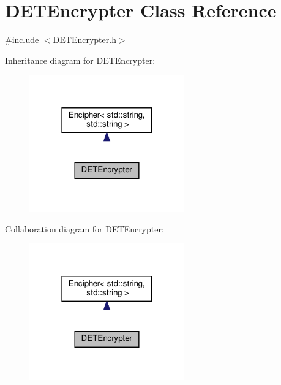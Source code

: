 \hypertarget{classDETEncrypter}{}\section{D\+E\+T\+Encrypter Class Reference}
\label{classDETEncrypter}


{\ttfamily \#include $<$D\+E\+T\+Encrypter.\+h$>$}



Inheritance diagram for D\+E\+T\+Encrypter\+:
\nopagebreak
\begin{figure}[H]
\begin{center}
\leavevmode
\includegraphics[width=190pt]{classDETEncrypter__inherit__graph}
\end{center}
\end{figure}


Collaboration diagram for D\+E\+T\+Encrypter\+:
\nopagebreak
\begin{figure}[H]
\begin{center}
\leavevmode
\includegraphics[width=190pt]{classDETEncrypter__coll__graph}
\end{center}
\end{figure}
